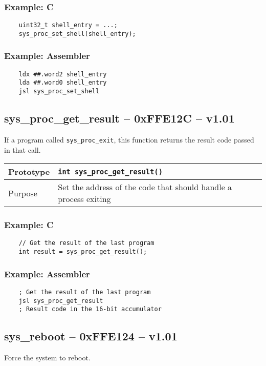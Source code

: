 \subsubsection*{Example: C}
\begin{lstlisting}
	uint32_t shell_entry = ...;
	sys_proc_set_shell(shell_entry);
\end{lstlisting}

\subsubsection*{Example: Assembler}
\begin{verbatim}
	ldx ##.word2 shell_entry
	lda ##.word0 shell_entry
	jsl sys_proc_set_shell
\end{verbatim}


\subsection*{sys\_proc\_get\_result -- 0xFFE12C -- v1.01}
If a program called \lstinline|sys_proc_exit|, this function returns the result code passed in that call.

\begin{table}[!h]\begin{tabular}{|l||l|} \hline
Prototype & \lstinline!int sys_proc_get_result()! \\ \hline
Purpose & Set the address of the code that should handle a process exiting \\ \hline
\end{tabular}\end{table}

\subsubsection*{Example: C}
\begin{lstlisting}
	// Get the result of the last program
	int result = sys_proc_get_result();	
\end{lstlisting}

\subsubsection*{Example: Assembler}
\begin{verbatim}
	; Get the result of the last program
	jsl sys_proc_get_result
	; Result code in the 16-bit accumulator
\end{verbatim}


\subsection*{sys\_reboot -- 0xFFE124 -- v1.01}
Force the system to reboot.

